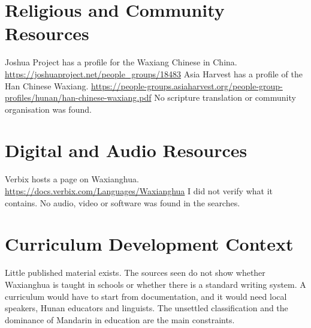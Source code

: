 \documentclass[12pt]{article}
\begin{document}
\section{Religious and Community Resources}
Joshua Project has a profile for the Waxiang Chinese in China. \url{https://joshuaproject.net/people_groups/18483} Asia Harvest has a profile of the Han Chinese Waxiang. \url{https://people-groups.asiaharvest.org/people-group-profiles/hunan/han-chinese-waxiang.pdf} No scripture translation or community organisation was found.

\section{Digital and Audio Resources}
Verbix hosts a page on Waxianghua. \url{https://docs.verbix.com/Languages/Waxianghua} I did not verify what it contains. No audio, video or software was found in the searches.

\section{Curriculum Development Context}
Little published material exists. The sources seen do not show whether Waxianghua is taught in schools or whether there is a standard writing system. A curriculum would have to start from documentation, and it would need local speakers, Hunan educators and linguists. The unsettled classification and the dominance of Mandarin in education are the main constraints.
\end{document}
